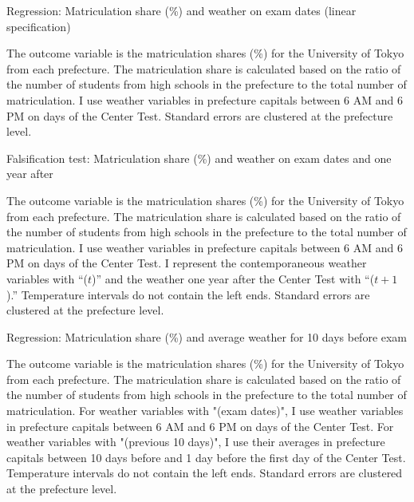 \documentclass[12pt,letterpaper]{article}
\begin{document}
\begin{table}[H]
  \center
  \caption{Regression: Matriculation share (\%) and weather on exam dates (linear specification)}
  \small
  
  \label{tab:linear_reg}
  \small
  \begin{tablenotes}
    \item
      The outcome variable is the matriculation shares (\%) for the University of Tokyo from each prefecture.
      The matriculation share is calculated based on the ratio of the number of students from high schools in the prefecture to the total number of matriculation.
      I use weather variables in prefecture capitals between 6 AM and 6 PM on days of the Center Test.
      Standard errors are clustered at the prefecture level.
  \end{tablenotes}
\end{table}

\begin{table}[H]
  \center
  \caption{Falsification test: Matriculation share (\%) and weather on exam dates and one year after}
  \scriptsize
  
  \label{tab:reg_placebo_exam}
  \scriptsize
  \begin{tablenotes}
    \item
      The outcome variable is the matriculation shares (\%) for the University of Tokyo from each prefecture.
      The matriculation share is calculated based on the ratio of the number of students from high schools in the prefecture to the total number of matriculation.
      I use weather variables in prefecture capitals between 6 AM and 6 PM on days of the Center Test.
      I represent the contemporaneous weather variables with ``($t$)'' and the weather one year after the Center Test with ``($t + 1$).''
      Temperature intervals do not contain the left ends.
      Standard errors are clustered at the prefecture level.
  \end{tablenotes}
\end{table}

\begin{table}[H]
  \center
  \caption{Regression: Matriculation share (\%) and average weather for 10 days before exam}
  \scriptsize
  
  \label{tab:reg_pre10}
  \scriptsize
  \begin{tablenotes}
    \item
      The outcome variable is the matriculation shares (\%) for the University of Tokyo from each prefecture.
      The matriculation share is calculated based on the ratio of the number of students from high schools in the prefecture to the total number of matriculation.
      For weather variables with "(exam dates)", I use weather variables in prefecture capitals between 6 AM and 6 PM on days of the Center Test.
      For weather variables with "(previous 10 days)", I use their averages in prefecture capitals between 10 days before and 1 day before the first day of the Center Test.
      Temperature intervals do not contain the left ends.
      Standard errors are clustered at the prefecture level.
  \end{tablenotes}
\end{table}
\end{document}
